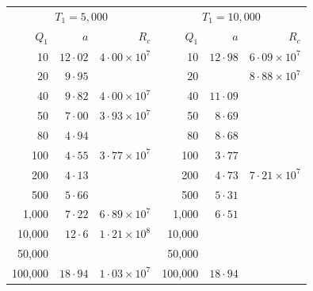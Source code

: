 \begin{table}[p]
\bigskip
\begin{tabular}{r@{\quad}r@{\quad}r|r@{\quad}r@{\quad}r}
\hline
\multicolumn{3}{c|}{$T_1 = 5{,}000$} & \multicolumn{3}{c}{$T_1 = 10{,}000$} \\
$Q_1$ & $a$ & $R_c$ & $Q_1$ & $a$ & $R_c$ \\
\hline
 10   & $12{\cdot}02$ & $4{\cdot}00\times10^{7}$ & 10   & $12{\cdot}98$ & $6{\cdot}09\times10^{7}$\\
 20   & $9{\cdot}95$  &                          & 20   &              & $8{\cdot}88\times10^{7}$\\
 40   & $9{\cdot}82$  & $4{\cdot}00\times10^{7}$ & 40   & $11{\cdot}09$ &           \\
 50   & $7{\cdot}00$  & $3{\cdot}93\times10^{7}$ & 50   & $8{\cdot}69$  &           \\
 80   & $4{\cdot}94$  &                          & 80   & $8{\cdot}68$  &           \\
 100  & $4{\cdot}55$  & $3{\cdot}77\times10^{7}$ & 100  & $3{\cdot}77$  &           \\
 200  & $4{\cdot}13$  &                          & 200  & $4{\cdot}73$  & $7{\cdot}21\times10^{7}$\\
 500  & $5{\cdot}66$  &                          & 500  & $5{\cdot}31$  &           \\
 1{,}000 & $7{\cdot}22$ & $6{\cdot}89\times10^{7}$& 1{,}000 & $6{\cdot}51$ &       \\
 10{,}000 & $12{\cdot}6$ & $1{\cdot}21\times10^{8}$& 10{,}000 &            &       \\
 50{,}000 &             &                        & 50{,}000 &              &       \\
 100{,}000 & $18{\cdot}94$ &$1{\cdot}03\times10^{7}$& 100{,}000 & $18{\cdot}94$ & \\
\hline
\end{tabular}


\end{table}
